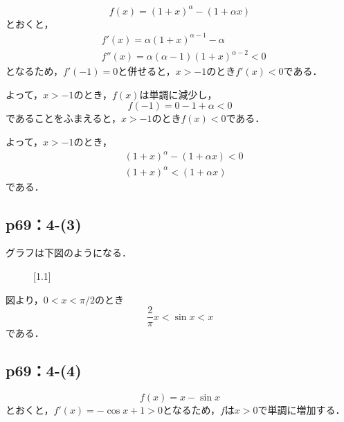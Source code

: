 \documentclass[uplatex,dvipdfmx,a4paper,10pt,fleqn]{jsarticle}
\newenvironment{tleftbar}{\begin{tbleftline}\setlength{\parindent}{1zw}}{\end{tbleftline}}
\begin{document}
\begin{tleftbar}
    \[
        f(x)=(1+x)^\alpha - (1+\alpha x)
    \]
    とおくと，
    \begin{align*} 
        &f'(x) = \alpha (1+x)^{\alpha -1} - \alpha \\
        & f''(x)= \alpha(\alpha-1) (1+x)^{\alpha -2} <0
    \end{align*} 
    となるため，$f'(-1)= 0$と併せると，$x>-1$のとき$f'(x) <0$である．

    よって，$ x>-1$のとき，$f(x)$は単調に減少し，
    \[
        f(-1)=0-1+\alpha <0
    \]
    であることをふまえると，$x>-1$のとき$f(x)<0$である．

    よって，$x>-1$のとき，
    \begin{align*} 
        & (1+x)^\alpha - (1+\alpha x)<0 \\
        & (1+x)^\alpha < (1+\alpha x)
    \end{align*} 
    である．
\end{tleftbar}


\subsection*{p69：4-(3)}


グラフは下図のようになる．
    \begin{figure}[htbp]
\scalebox{1.1}[1.1]{
 }
\end{figure}

図より，$0<x<\pi/2$のとき
\[
    \frac{2}{\pi} x < \sin x < x 
\]
である．


\subsection*{p69：4-(4)}

\[
    f(x)= x - \sin x
\]
とおくと，$f'(x)= -\cos x+1>0$となるため，$f$は$x>0$で単調に増加する．
\end{document}
